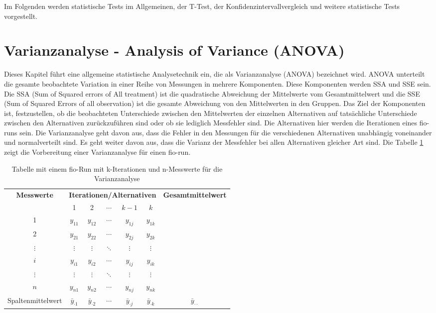 Im Folgenden werden statistische Tests im
Allgemeinen, der T-Test, der Konfidenzintervallvergleich und weitere statistische Tests
vorgestellt.

\section{Varianzanalyse - Analysis of Variance (ANOVA)}

Dieses Kapitel führt eine allgemeine statistische Analysetechnik ein, die als Varianzanalyse (ANOVA) bezeichnet wird. 
ANOVA unterteilt die gesamte beobachtete Variation in einer Reihe von Messungen in mehrere Komponenten.
Diese Komponenten werden SSA und SSE sein.
Die SSA (Sum of Squared errors of All treatment) ist die quadratische Abweichung der Mittelwerte vom Gesamtmittelwert und die SSE 
(Sum of Squared Errors of all observation) ist die gesamte Abweichung von den Mittelwerten in den Gruppen.
Das Ziel der Komponenten ist, festzustellen, ob die beobachteten Unterschiede zwischen den Mittelwerten der einzelnen Alternativen auf tatsächliche 
Unterschiede zwischen den Alternativen zurückzuführen sind oder ob sie lediglich Messfehler sind.
Die Alternativen hier werden die Iterationen eines fio-runs sein.
Die Varianzanalyse geht davon aus, dass die Fehler in den Messungen für die verschiedenen Alternativen
unabhängig voneinander und normalverteilt sind.
Es geht weiter davon aus, dass die Varianz der Messfehler bei allen Alternativen gleicher Art sind.
Die Tabelle \ref{tab:measurements} zeigt die Vorbereitung einer Varianzanalyse für einen fio-run.

\begin{table}[h!]
  \centering
  \begin{tabular}{|c|*{5}{c}|c|}
  \hline
  \textbf{Messwerte} & \multicolumn{5}{c|}{\textbf{Iterationen/Alternativen}} & \textbf{Gesamtmittelwert} \\
  \cline{2-6}
   & 1 & 2 & $\cdots$ & $k-1$ & $k$ & \\
  \hline
  1 & $y_{11}$ & $y_{12}$ & $\cdots$ & $y_{1j}$ & $y_{1k}$ & \\
  2 & $y_{21}$ & $y_{22}$ & $\cdots$ & $y_{2j}$ & $y_{2k}$ & \\
  $\vdots$ & $\vdots$ & $\vdots$ & $\ddots$ & $\vdots$ & $\vdots$ & \\
  $i$ & $y_{i1}$ & $y_{i2}$ & $\cdots$ & $y_{ij}$ & $y_{ik}$ & \\
  $\vdots$ & $\vdots$ & $\vdots$ & $\ddots$ & $\vdots$ & $\vdots$ & \\
  $n$ & $y_{n1}$ & $y_{n2}$ & $\cdots$ & $y_{nj}$ & $y_{nk}$ &  \\
  \hline
  Spaltenmittelwert & $\bar{y}_{\cdot1}$ & $\bar{y}_{\cdot2}$ & $\cdots$ & $\bar{y}_{\cdot j}$ & $\bar{y}_{\cdot k}$ & $\bar{y}_{\cdot \cdot}$ \\
  \hline
  \end{tabular}
  \caption{Tabelle mit einem fio-Run mit k-Iterationen und n-Messwerte für die Varianzanalyse}
  \label{tab:measurements}
\end{table}

